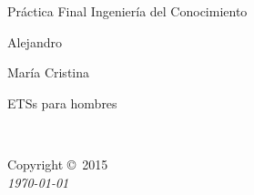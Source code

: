 \documentclass[11pt,fleqn]{book} %
\begin{document}

\begingroup
\thispagestyle{empty}
\centering
\vspace*{9cm}
\par\normalfont\fontsize{35}{35}\sffamily\selectfont
Práctica Final Ingeniería del Conocimiento\par %
\vspace*{1cm}
{\large Alejandro}\par %
{\large María Cristina}\par %

{\footnotesize ETSs para hombres}\par

\endgroup


\newpage
~\vfill
\thispagestyle{empty}

\noindent Copyright \copyright\ 2015 \\ %

\noindent \textit{\today} %



\pagestyle{empty} %

\tableofcontents %

\cleardoublepage %

\pagestyle{fancy} %



\end{document}
